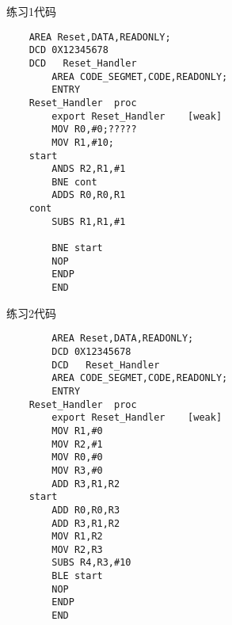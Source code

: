 \documentclass[a4paper,10pt,UTF8]{paper}
\numberwithin{equation}{section}
\numberwithin{figure}{section}
\begin{document}
练习1代码
\begin{verbatim}
    AREA Reset,DATA,READONLY;
    DCD 0X12345678
    DCD   Reset_Handler
        AREA CODE_SEGMET,CODE,READONLY;
        ENTRY
    Reset_Handler  proc
        export Reset_Handler    [weak]
        MOV R0,#0;?????
        MOV R1,#10;
    start
        ANDS R2,R1,#1
        BNE cont
        ADDS R0,R0,R1    
    cont
        SUBS R1,R1,#1

        BNE start
        NOP
        ENDP
        END

\end{verbatim}

练习2代码

\begin{verbatim}
        AREA Reset,DATA,READONLY;
        DCD 0X12345678
        DCD   Reset_Handler
        AREA CODE_SEGMET,CODE,READONLY;
        ENTRY
    Reset_Handler  proc
        export Reset_Handler    [weak]
        MOV R1,#0
        MOV R2,#1
        MOV R0,#0
        MOV R3,#0
        ADD R3,R1,R2
    start
        ADD R0,R0,R3
        ADD R3,R1,R2
        MOV R1,R2
        MOV R2,R3
        SUBS R4,R3,#10
        BLE start
        NOP
        ENDP
        END

\end{verbatim}
\end{document}
